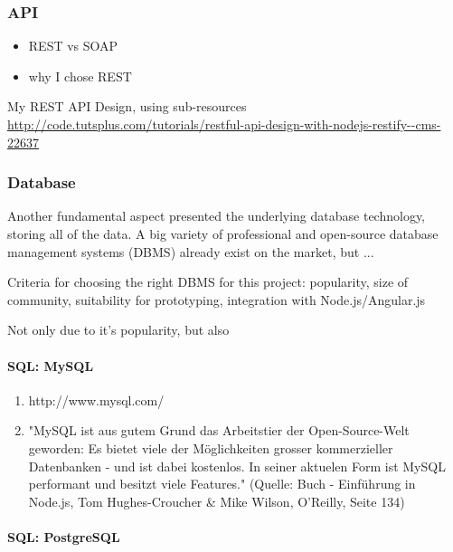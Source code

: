 \subsubsection{API}

\begin{itemize}
\item REST vs SOAP
\item why I chose REST
\end{itemize}

My REST API Design, using sub-resources \url{http://code.tutsplus.com/tutorials/restful-api-design-with-nodejs-restify--cms-22637}




\subsubsection{Database}

Another fundamental aspect presented the underlying database technology, storing all of the data. A big variety of professional and open-source database management systems (DBMS) already exist on the market, but ...

Criteria for choosing the right DBMS for this project: popularity, size of community, suitability for prototyping, integration with Node.js/Angular.js



Not only due to it's popularity, but also 


\paragraph{SQL: MySQL}

\begin{enumerate}
\item http://www.mysql.com/
\item "MySQL ist aus gutem Grund das Arbeitstier der Open-Source-Welt geworden: Es bietet viele der M\"oglichkeiten grosser kommerzieller Datenbanken - und ist dabei kostenlos. In seiner aktuelen Form ist MySQL performant und besitzt viele Features." \cite{hughes2012einfuhrung} (Quelle: Buch - Einf\"uhrung in Node.js, Tom Hughes-Croucher \& Mike Wilson, O'Reilly, Seite 134)
\end{enumerate}


\paragraph{SQL: PostgreSQL}

